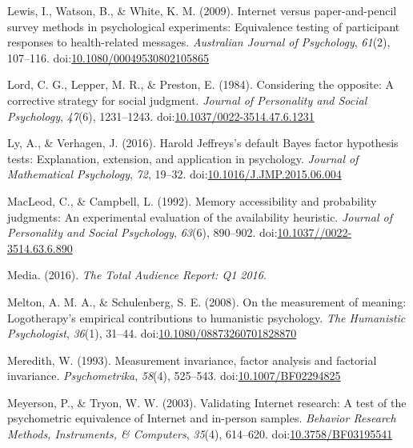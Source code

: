 \documentclass[english,man]{apa6}
\theoremstyle{definition}
\theoremstyle{definition}
\theoremstyle{definition}
\theoremstyle{remark}
\begin{document}
\hypertarget{ref-Lewis2009}{}
Lewis, I., Watson, B., \& White, K. M. (2009). Internet versus
paper-and-pencil survey methods in psychological experiments:
Equivalence testing of participant responses to health-related messages.
\emph{Australian Journal of Psychology}, \emph{61}(2), 107--116.
doi:\href{https://doi.org/10.1080/00049530802105865}{10.1080/00049530802105865}

\hypertarget{ref-Lord1984}{}
Lord, C. G., Lepper, M. R., \& Preston, E. (1984). Considering the
opposite: A corrective strategy for social judgment. \emph{Journal of
Personality and Social Psychology}, \emph{47}(6), 1231--1243.
doi:\href{https://doi.org/10.1037/0022-3514.47.6.1231}{10.1037/0022-3514.47.6.1231}

\hypertarget{ref-Ly2016}{}
Ly, A., \& Verhagen, J. (2016). Harold Jeffreys's default Bayes factor
hypothesis tests: Explanation, extension, and application in psychology.
\emph{Journal of Mathematical Psychology}, \emph{72}, 19--32.
doi:\href{https://doi.org/10.1016/J.JMP.2015.06.004}{10.1016/J.JMP.2015.06.004}

\hypertarget{ref-MacLeod1992}{}
MacLeod, C., \& Campbell, L. (1992). Memory accessibility and
probability judgments: An experimental evaluation of the availability
heuristic. \emph{Journal of Personality and Social Psychology},
\emph{63}(6), 890--902.
doi:\href{https://doi.org/10.1037//0022-3514.63.6.890}{10.1037//0022-3514.63.6.890}

\hypertarget{ref-Media2016}{}
Media. (2016). \emph{The Total Audience Report: Q1 2016}.

\hypertarget{ref-Melton2008}{}
Melton, A. M. A., \& Schulenberg, S. E. (2008). On the measurement of
meaning: Logotherapy's empirical contributions to humanistic psychology.
\emph{The Humanistic Psychologist}, \emph{36}(1), 31--44.
doi:\href{https://doi.org/10.1080/08873260701828870}{10.1080/08873260701828870}

\hypertarget{ref-Meredith1993}{}
Meredith, W. (1993). Measurement invariance, factor analysis and
factorial invariance. \emph{Psychometrika}, \emph{58}(4), 525--543.
doi:\href{https://doi.org/10.1007/BF02294825}{10.1007/BF02294825}

\hypertarget{ref-Meyerson2003}{}
Meyerson, P., \& Tryon, W. W. (2003). Validating Internet research: A
test of the psychometric equivalence of Internet and in-person samples.
\emph{Behavior Research Methods, Instruments, \& Computers},
\emph{35}(4), 614--620.
doi:\href{https://doi.org/10.3758/BF03195541}{10.3758/BF03195541}
\end{document}
